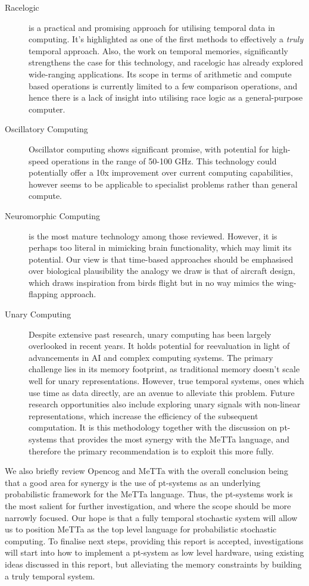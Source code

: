 \documentclass{article}
\begin{document}
\begin{description}

	\item[Racelogic] is a practical and promising approach for utilising temporal data in computing. It's highlighted as one of the first methods to effectively a \textit{truly} temporal approach. Also, the work on temporal memories, significantly strengthens the case for this technology, and racelogic has already explored wide-ranging applications. Its scope in terms of arithmetic and compute based operations is currently limited to a few comparison operations, and hence there is a lack of insight into utilising race logic as a general-purpose computer.


	\item[Oscillatory Computing] Oscillator computing shows significant promise, with potential for high-speed operations in the range of 50-100 GHz. This technology could potentially offer a 10x improvement over current computing capabilities, however seems to be applicable to specialist problems rather than general compute.

	\item[Neuromorphic Computing] is the most mature technology among those reviewed. However, it is perhaps too literal in mimicking brain functionality, which may limit its potential. Our view is that time-based approaches should be emphasised over biological plausibility the analogy we draw is that of aircraft design, which draws inspiration from birds flight but in no way mimics the wing-flapping approach.


	\item[Unary Computing] Despite extensive past research, unary computing has been largely overlooked in recent years. It holds potential for reevaluation in light of advancements in AI and complex computing systems. The primary challenge lies in its memory footprint, as traditional memory doesn't scale well for unary representations. However, true temporal systems, ones which use time as data directly, are an avenue to alleviate this problem. Future research opportunities also include exploring unary signals with non-linear representations, which increase the efficiency of the subsequent computation. It is this methodology together with the discussion on pt-systems that provides the most synergy with the MeTTa language, and therefore the primary recommendation is to exploit this more fully.
\end{description}

We also briefly review Opencog and MeTTa with the overall conclusion being that a good area for synergy is the use of pt-systems as an underlying probabilistic framework for the MeTTa language. Thus, the pt-systems work is the most salient for further investigation, and where the scope should be more narrowly focused. Our hope is that a fully temporal stochastic system will allow us to position MeTTa as the  top level language for probabilistic stochastic computing. 
To finalise next steps, providing this report is accepted, investigations will start into how to implement a pt-system as low level hardware, using existing ideas discussed in this report, but alleviating the memory constraints by building a truly temporal system.  




\end{document}
